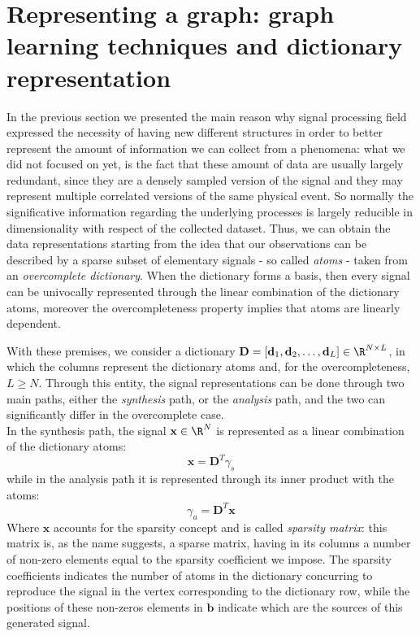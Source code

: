 \chapter{Representing a graph: graph learning techniques and dictionary representation}
In the previous section we presented the main reason why signal processing field expressed the necessity of having new different structures in order to better represent the amount of information we can collect from a phenomena: what we did not focused on yet, is the fact that these amount of data are usually largely redundant, since they are a densely sampled version of the signal and they may represent multiple correlated versions of the same physical event. So normally the significative information regarding the underlying processes is largely reducible in dimensionality with respect of the collected dataset. \cite{Tosic2011} Thus, we can obtain the data representations starting from the idea that our observations can be described by a sparse subset of elementary signals - so called \textit{atoms} - taken from an \textit{overcomplete dictionary}. When the dictionary forms a basis, then every signal can be univocally represented through the linear combination of the dictionary atoms, moreover the overcompleteness property implies that atoms are linearly dependent. \cite{Tosic2011} \cite{Rubinstein2010}

With these premises, we consider a dictionary $\textbf{D} = [\textbf{d}_1, \textbf{d}_2, \dots, \textbf{d}_L] \in \R^{N \times L}$, in which the columns represent the dictionary atoms and, for the overcompleteness, $L\geq N$. Through this entity, the signal representations can be done through two main paths, either the \textit{synthesis} path, or the \textit{analysis} path, and the two can significantly differ in the overcomplete case.\\
In the synthesis path, the signal $\textbf{x} \in \R^N$ is represented as a linear combination of the dictionary atoms:
\begin{equation}
\textbf{x} = \textbf{D}^T \gamma_s
\label{eq:synthesis}
\end{equation}
while in the analysis path it is represented through its inner product with the atoms:
\begin{equation}
\gamma_a = \textbf{D}^T \textbf{x}
\label{eq:analysis}
\end{equation}
Where $\textbf{x}$ accounts for the sparsity concept and is called \textit{sparsity matrix}: this matrix is, as the name suggests, a sparse matrix, having in its columns a number of non-zero elements equal to the sparsity coefficient we impose. The sparsity coefficients indicates the number of atoms in the dictionary concurring to reproduce the signal in the vertex corresponding to the dictionary row, while the positions of these non-zeros elements in $\textbf{b}$ indicate which are the sources of this generated signal.\\

